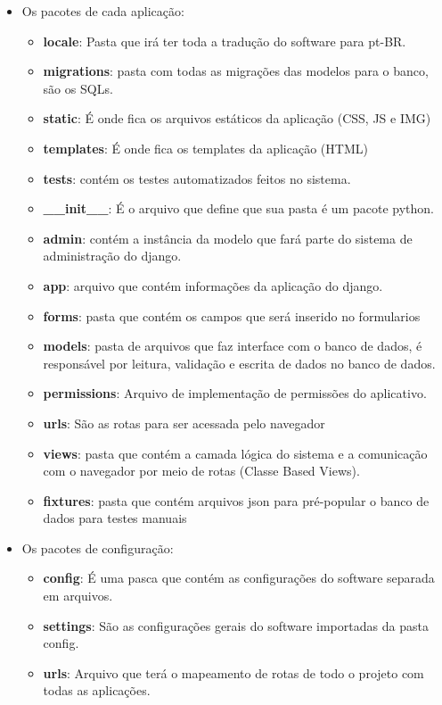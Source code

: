 \begin{itemize}
  \item Os pacotes de cada aplicação:
  \begin{itemize}
    \item \textbf{locale}: Pasta que irá ter toda a tradução do software para pt-BR.
    \item \textbf{migrations}: pasta com todas as migrações das modelos para o banco, são os SQLs.
    \item \textbf{static}: É onde fica os arquivos estáticos da aplicação (CSS, JS e IMG)
    \item \textbf{templates}: É onde fica os templates da aplicação (HTML)
    \item \textbf{tests}: contém os testes automatizados feitos no sistema.
    \item \textbf{\_\_init\_\_}: É o arquivo que define que sua pasta é um pacote python.
    \item \textbf{admin}: contém a instância da modelo que fará parte do sistema de administração do django.
    \item \textbf{app}: arquivo que contém informações da aplicação do django.
    \item \textbf{forms}: pasta que contém os campos que será inserido no formularios
    \item \textbf{models}: pasta de arquivos que faz interface com o banco de dados, é responsável por leitura,
      validação e escrita de dados no banco de dados.
    \item \textbf{permissions}: Arquivo de implementação de permissões do aplicativo.
    \item \textbf{urls}: São as rotas para ser acessada pelo navegador
    \item \textbf{views}: pasta que contém a camada lógica do sistema e a comunicação com o navegador por meio de
      rotas (Classe Based Views).
    \item \textbf{fixtures}: pasta que contém arquivos json para pré-popular o banco de dados para testes manuais
  \end{itemize}
  \item Os pacotes de configuração:
  \begin{itemize}
    \item \textbf{config}: É uma pasca que contém as configurações do software separada em arquivos.
    \item \textbf{settings}: São as configurações gerais do software importadas da pasta config.
    \item \textbf{urls}: Arquivo que terá o mapeamento de rotas de todo o projeto com todas as aplicações.

\end{itemize}
\end{itemize}
